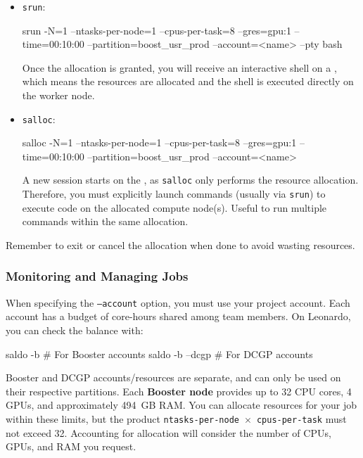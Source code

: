 \begin{itemize}
\item \texttt{srun}:

    \begin{codeblock}[language=bash, numbers=none]
srun -N=1 --ntasks-per-node=1 --cpus-per-task=8 --gres=gpu:1 --time=00:10:00 --partition=boost_usr_prod --account=<name> --pty bash
    \end{codeblock}

    Once the allocation is granted, you will receive an interactive shell on a , which means the resources are allocated and the shell is executed directly on the worker node.

    \item \texttt{salloc}:

    \begin{codeblock}[language=bash, numbers=none]
salloc -N=1 --ntasks-per-node=1 --cpus-per-task=8 --gres=gpu:1 --time=00:10:00 --partition=boost_usr_prod --account=<name>
    \end{codeblock}

    A new session starts on the , as \texttt{salloc} only performs the resource allocation. Therefore, you must explicitly launch commands (usually via \texttt{srun}) to execute code on the allocated compute node(s). Useful to run multiple commands within the same allocation.
\end{itemize}

\begin{warningblock}
    Remember to exit or cancel the allocation when done to avoid wasting resources.
\end{warningblock}

\subsubsection{Monitoring and Managing Jobs}

When specifying the \texttt{--account} option, you must use your project account. Each account has a budget of core-hours shared among team members. On Leonardo, you can check the balance with:

\begin{codeblock}[language=bash, numbers=none]
saldo -b         # For Booster accounts
saldo -b --dcgp  # For DCGP accounts
\end{codeblock}

Booster and DCGP accounts/resources are separate, and can only be used on their respective partitions. Each \textbf{Booster node} provides up to 32 CPU cores, 4 GPUs, and approximately 494~GB RAM. You can allocate resources for your job within these limits, but the product \texttt{ntasks-per-node}~$\times$~\texttt{cpus-per-task} must not exceed 32. Accounting for allocation will consider the number of CPUs, GPUs, and RAM you request.

